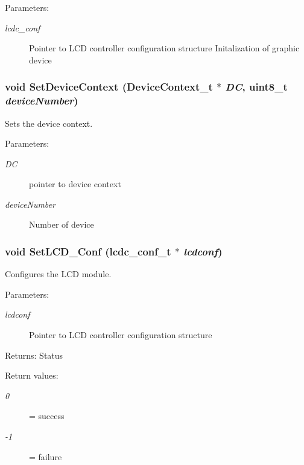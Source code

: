 \begin{Desc}
\item[Parameters:]
\begin{description}
\item[{\em lcdc\_\-conf}]Pointer to LCD controller configuration structure Initalization of graphic device \end{description}
\end{Desc}
\hypertarget{group__ap7000__lcd_gf5e9e0c22e0b24937dd062a816e80cfc}{
\subsubsection[{SetDeviceContext}]{\setlength{\rightskip}{0pt plus 5cm}void SetDeviceContext ({\bf DeviceContext\_\-t} $\ast$ {\em DC}, \/  uint8\_\-t {\em deviceNumber})}}
\label{group__ap7000__lcd_gf5e9e0c22e0b24937dd062a816e80cfc}


Sets the device context. 

\begin{Desc}
\item[Parameters:]
\begin{description}
\item[{\em DC}]pointer to device context \item[{\em deviceNumber}]Number of device \end{description}
\end{Desc}
\hypertarget{group__ap7000__lcd_gb241bf31e7011997b92062d0a4777168}{
\subsubsection[{SetLCD\_\-Conf}]{\setlength{\rightskip}{0pt plus 5cm}void SetLCD\_\-Conf ({\bf lcdc\_\-conf\_\-t} $\ast$ {\em lcdconf})}}
\label{group__ap7000__lcd_gb241bf31e7011997b92062d0a4777168}


Configures the LCD module. 

\begin{Desc}
\item[Parameters:]
\begin{description}
\item[{\em lcdconf}]Pointer to LCD controller configuration structure\end{description}
\end{Desc}
\begin{Desc}
\item[Returns:]Status \end{Desc}
\begin{Desc}
\item[Return values:]
\begin{description}
\item[{\em 0}]= success \item[{\em -1}]= failure \end{description}
\end{Desc}


